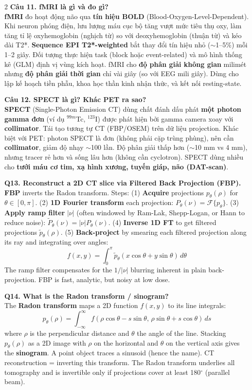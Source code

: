 \begin{paracol}{2}
\textbf{Câu 11. fMRI là gì và đo gì?}\\
\textbf{fMRI} đo hoạt động não qua \textbf{tín hiệu BOLD} (Blood-Oxygen-Level-Dependent). Khi neuron phóng điện, lưu lượng máu cục bộ tăng vượt mức tiêu thụ oxy, làm tăng tỉ lệ oxyhemoglobin (nghịch từ) so với deoxyhemoglobin (thuận từ) và kéo dài T2*. \textbf{Sequence EPI T2*-weighted} bắt thay đổi tín hiệu nhỏ ($\sim$1--5\%) mỗi 1--2 giây. Đối tượng thực hiện task (block hoặc event-related) và mô hình thống kê (GLM) định vị vùng kích hoạt. fMRI cho \textbf{độ phân giải không gian} milimét nhưng \textbf{độ phân giải thời gian} chỉ vài giây (so với EEG mili giây). Dùng cho lập kế hoạch tiền phẫu, khoa học thần kinh nhận thức, và kết nối resting-state.

\textbf{Câu 12. SPECT là gì? Khác PET ra sao?}\\
\textbf{SPECT} (Single-Photon Emission CT) dùng chất đánh dấu phát \textbf{một photon gamma đơn} (ví dụ $^{99m}$Tc, $^{123}$I) được phát hiện bởi gamma camera xoay với \textbf{collimator}. Tái tạo tương tự CT (FBP/OSEM) trên dữ liệu projection. Khác biệt với PET: photon SPECT là đơn (không phải cặp trùng phùng), nên cần \textbf{collimator}, giảm độ nhạy $\sim$100 lần. Độ phân giải thấp hơn ($\sim$10 mm vs 4 mm), nhưng tracer rẻ hơn và sống lâu hơn (không cần cyclotron). SPECT dùng nhiều cho \textbf{tưới máu cơ tim, xạ hình xương, tuyến giáp, não (DAT-scan)}.

\switchcolumn*

\textbf{Q13. Reconstruct a 2D CT slice via Filtered Back Projection (FBP).}\\
\textbf{FBP} inverts the Radon transform. Steps: (1) \textbf{Acquire} projections $p_\theta(\rho)$ for $\theta \in [0,\pi]$. (2) \textbf{1D Fourier transform} each projection: $P_\theta(\nu) = \mathcal{F}\{p_\theta\}$. (3) \textbf{Apply ramp filter} $|\nu|$ (often windowed by Ram-Lak, Shepp-Logan, or Hann to reduce noise): $\tilde{P}_\theta(\nu) = |\nu| P_\theta(\nu)$. (4) \textbf{Inverse 1D FT} to get filtered projections $\tilde{p}_\theta(\rho)$. (5) \textbf{Back-project} by smearing each filtered projection along its ray and integrating over angles:
$$f(x,y) = \int_0^\pi \tilde{p}_\theta(x\cos\theta + y\sin\theta)\,d\theta$$
The ramp filter compensates for the $1/|\nu|$ blurring inherent in plain back-projection. FBP is fast, analytic, but noisy at low dose.

\textbf{Q14. What is the Radon transform / sinogram?}\\
The \textbf{Radon transform} maps a 2D function $f(x,y)$ to its line integrals:
$$p_\theta(\rho) = \int_{-\infty}^{\infty} f(\rho\cos\theta - s\sin\theta,\,\rho\sin\theta + s\cos\theta)\,ds$$
where $\rho$ is the perpendicular distance and $\theta$ the angle of the line. Stacking $p_\theta(\rho)$ as a 2D image with $\rho$ on the horizontal and $\theta$ on the vertical axis gives the \textbf{sinogram}. A point object traces a sinusoid (hence the name). CT reconstruction = inverting this transform. The Radon transform underlies all tomography and is invertible only if projections cover at least 180$^\circ$ (parallel beam).


\end{paracol}
